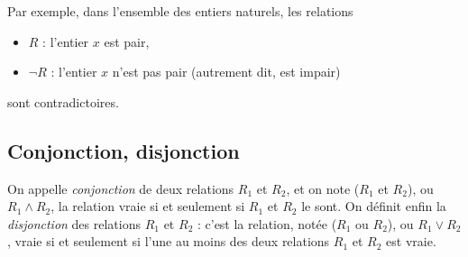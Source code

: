 \documentclass[10pt,parskip=half,chapterprefix=true]{scrbook}
\newlength{\largeurperso}
\begin{document}
\medskip Par exemple, dans l'ensemble des entiers naturels, les
relations
\begin{itemize}
  \settowidth{\largeurperso}{\(\neg\)}
\item [] \hspace{\largeurperso}\(R\) : l'entier \(x\) est pair,
\item [] \(\neg R\) : l'entier \(x\) n'est pas pair (autrement dit,
  est impair)
\end{itemize}
sont contradictoires.

\subsection*{Conjonction, disjonction}

On appelle \emph{conjonction} de deux relations \(R_1\) et \(R_2\), et on note (\(R_1\) et \(R_2\)), ou \(R_1\wedge R_2\), la relation vraie si et seulement si \(R_1\) et \(R_2\) le sont. On définit enfin la \emph{disjonction} des relations \(R_1\) et \(R_2\) : c'est la relation, notée (\(R_1\) ou \(R_2\)), ou \(R_1\vee R_2\), vraie si et seulement si l'une au moins des deux relations \(R_1\) et \(R_2\) est vraie.
\end{document}
